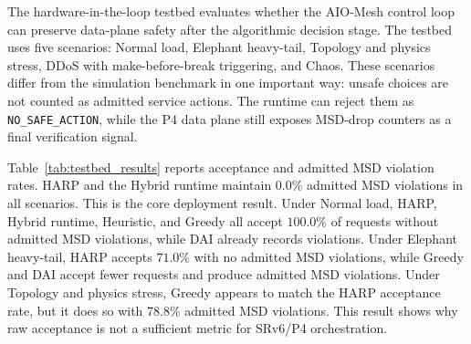 \documentclass[final,5p]{elsarticle}
\begin{document}
The hardware-in-the-loop testbed evaluates whether the AIO-Mesh control loop can preserve data-plane safety after the algorithmic decision stage. The testbed uses five scenarios: Normal load, Elephant heavy-tail, Topology and physics stress, DDoS with make-before-break triggering, and Chaos. These scenarios differ from the simulation benchmark in one important way: unsafe choices are not counted as admitted service actions. The runtime can reject them as \texttt{NO\_SAFE\_ACTION}, while the P4 data plane still exposes MSD-drop counters as a final verification signal.

Table~\ref{tab:testbed_results} reports acceptance and admitted MSD violation rates. HARP and the Hybrid runtime maintain \(0.0\%\) admitted MSD violations in all scenarios. This is the core deployment result. Under Normal load, HARP, Hybrid runtime, Heuristic, and Greedy all accept \(100.0\%\) of requests without admitted MSD violations, while DAI already records violations. Under Elephant heavy-tail, HARP accepts \(71.0\%\) with no admitted MSD violations, while Greedy and DAI accept fewer requests and produce admitted MSD violations. Under Topology and physics stress, Greedy appears to match the HARP acceptance rate, but it does so with \(78.8\%\) admitted MSD violations. This result shows why raw acceptance is not a sufficient metric for SRv6/P4 orchestration.

\begin{table}[t]
\centering
\caption{Hardware-in-the-loop testbed results: acceptance rate / admitted MSD violation rate.}
\label{tab:testbed_results}
\renewcommand{\arraystretch}{1.08}
\setlength{\tabcolsep}{2pt}
\scriptsize
{}
\end{table}
\end{document}

